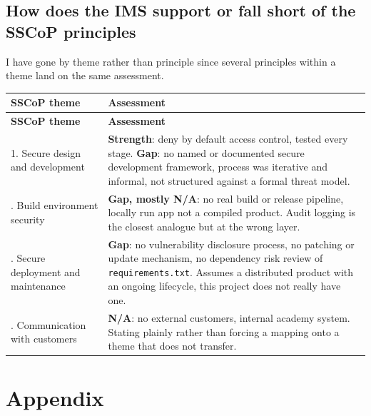 \documentclass[12pt,a4paper]{article}
\begin{document}
\subsection{How does the IMS support or fall short of the SSCoP principles}

I have gone by theme rather than principle since several principles within a theme land on the same assessment.

\footnotesize
\renewcommand{\arraystretch}{1.3}
\begin{longtable}{@{} >{\raggedright\arraybackslash}p{4.2cm} >{\raggedright\arraybackslash}p{10.3cm} @{}}
\toprule
\textbf{SSCoP theme} & \textbf{Assessment} \\
\midrule
\endfirsthead

\toprule
\textbf{SSCoP theme} & \textbf{Assessment} \\
\midrule
\endhead

\bottomrule
\endfoot

1. Secure design and development &
\textbf{Strength}: deny by default access control, tested every stage. \textbf{Gap}: no named or documented secure development framework, process was iterative and informal, not structured against a formal threat model. \\[0.6em]

2. Build environment security &
\textbf{Gap, mostly N/A}: no real build or release pipeline, locally run app not a compiled product. Audit logging is the closest analogue but at the wrong layer. \\[0.6em]

3. Secure deployment and maintenance &
\textbf{Gap}: no vulnerability disclosure process, no patching or update mechanism, no dependency risk review of \lstinline|requirements.txt|. Assumes a distributed product with an ongoing lifecycle, this project does not really have one. \\[0.6em]

4. Communication with customers &
\textbf{N/A}: no external customers, internal academy system. Stating plainly rather than forcing a mapping onto a theme that does not transfer. \\

\end{longtable}
\renewcommand{\arraystretch}{1.0}
\normalsize

\newpage
\section*{Appendix}
\end{document}
